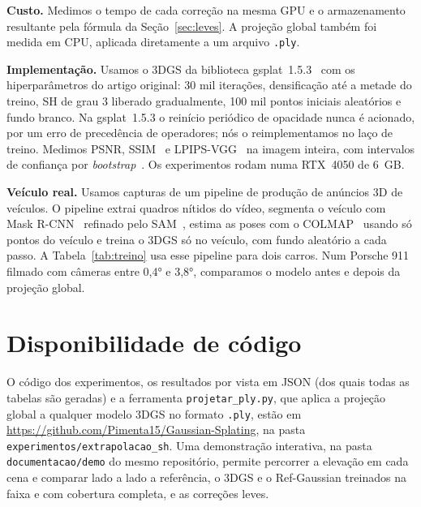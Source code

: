 \documentclass[conference]{IEEEtran}
\begin{document}
\textbf{Custo.} Medimos o tempo de cada correção na mesma GPU e o armazenamento resultante pela fórmula da Seção~\ref{sec:leves}. A projeção global também foi medida em CPU, aplicada diretamente a um arquivo \texttt{.ply}.

\textbf{Implementação.} Usamos o 3DGS da biblioteca gsplat~1.5.3~\cite{ye2025gsplat} com os hiperparâmetros do artigo original: 30 mil iterações, densificação até a metade do treino, SH de grau 3 liberado gradualmente, 100 mil pontos iniciais aleatórios e fundo branco. Na gsplat~1.5.3 o reinício periódico de opacidade nunca é acionado, por um erro de precedência de operadores; nós o reimplementamos no laço de treino. Medimos PSNR, SSIM~\cite{wang2004ssim} e LPIPS-VGG~\cite{zhang2018lpips} na imagem inteira, com intervalos de confiança por \textit{bootstrap}~\cite{efron1993bootstrap}. Os experimentos rodam numa RTX~4050 de 6~GB.

\textbf{Veículo real.} Usamos capturas de um pipeline de produção de anúncios 3D de veículos. O pipeline extrai quadros nítidos do vídeo, segmenta o veículo com Mask R-CNN~\cite{he2017maskrcnn} refinado pelo SAM~\cite{kirillov2023sam}, estima as poses com o COLMAP~\cite{schonberger2016colmap} usando só pontos do veículo e treina o 3DGS só no veículo, com fundo aleatório a cada passo. A Tabela~\ref{tab:treino} usa esse pipeline para dois carros. Num Porsche 911 filmado com câmeras entre 0,4° e 3,8°, comparamos o modelo antes e depois da projeção global.





\section*{Disponibilidade de código}
O código dos experimentos, os resultados por vista em JSON (dos quais todas as tabelas são geradas) e a ferramenta \texttt{projetar\_ply.py}, que aplica a projeção global a qualquer modelo 3DGS no formato \texttt{.ply}, estão em \url{https://github.com/Pimenta15/Gaussian-Splating}, na pasta \texttt{experimentos/extrapolacao\_sh}. Uma demonstração interativa, na pasta \texttt{documentacao/demo} do mesmo repositório, permite percorrer a elevação em cada cena e comparar lado a lado a referência, o 3DGS e o Ref-Gaussian treinados na faixa e com cobertura completa, e as correções leves.


\end{document}
